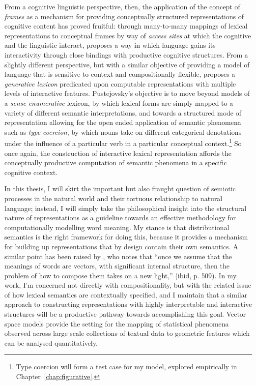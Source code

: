 From a cognitive linguistic perspective, then, the application of the concept of \emph{frames} \citep{Barsalou1992} as a mechanism for providing conceptually structured representations of cognitive content has proved fruitful: through many-to-many mappings of lexical representations to conceptual frames by way of \emph{access sites} at which the cognitive and the linguistic interact, \cite{Evans2009} proposes a way in which language gains its interactivity through close bindings with productive cognitive structures.  From a slightly different perspective, but with a similar objective of providing a model of language that is sensitive to context and compositionally flexible, \cite{Pustejovsky1995} proposes a \emph{generative lexicon} predicated upon computable representations with multiple levels of interactive features.  Pustejovsky's objective is to move beyond models of a \emph{sense enumerative} lexicon, by which lexical forms are simply mapped to a variety of different semantic interpretations, and towards a structured mode of representation allowing for the open ended application of semantic phenomena such as \emph{type coercion}, by which nouns take on different categorical denotations under the influence of a particular verb in a particular conceptual context.\footnote{Type coercion will form a test case for my model, explored empirically in Chapter~\ref{chap:figurative}.}  So once again, the construction of interactive lexical representation affords the conceptually productive computation of semantic phenomena in a specific cognitive context.

In this thesis, I will skirt the important but also fraught question of semiotic processes in the natural world and their tortuous relationship to natural language; instead, I will simply take the philosophical insight into the structural nature of representations as a guideline towards an effective methodology for computationally modelling word meaning.  My stance is that distributional semantics is the right framework for doing this, because it provides a mechanism for building up representations that by design contain their own semantics.  A similar point has been raised by \cite{Clark2015}, who notes that ``once we assume that the meanings of words are vectors, with significant internal structure, then the problem of how to compose them takes on a new light,'' (ibid, p. 509).  In my work, I'm concerned not directly with compositionality, but with the related issue of how lexical semantics are contextually specified, and I maintain that a similar approach to constructing representations with highly interpretable and interactive structures will be a productive pathway towards accomplishing this goal.  Vector space models provide the setting for the mapping of statistical phenomena observed across large scale collections of textual data to geometric features which can be analysed quantitatively.

